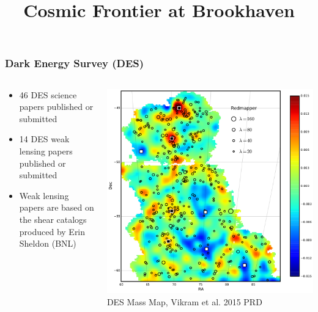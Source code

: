 \documentclass{beamer}
\title{Cosmic Frontier at Brookhaven}
\begin{document}

\frame
{

    \frametitle{Dark Energy Survey (DES)}

    \fontsize{9}{0.8\baselineskip}

    \begin{columns}

        \begin{column}{0.5\textwidth}

            \begin{itemize}

                \item 46 DES science papers published or submitted

                \item 14 DES weak lensing papers published or submitted

                \item Weak lensing papers are based on the shear catalogs produced
                    by Erin Sheldon (BNL)

            \end{itemize}

        \end{column}

        \begin{column}{0.5\textwidth}
            \includegraphics[scale=0.17]{cluster_overlay_ngmix_bpz.pdf}
            \newline
            {\tiny DES Mass Map, Vikram et al. 2015 PRD}
        \end{column}

    \end{columns}

}
\end{document}
